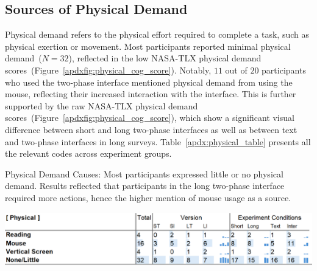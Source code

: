 \subsection{Sources of Physical Demand} 
\label{apdx:physical}
Physical demand refers to the physical effort required to complete a task, such as physical exertion or movement. Most participants reported minimal physical demand~($N=32$), reflected in the low NASA-TLX physical demand scores~(Figure~\ref{apdxfig:physical_cog_score}). Notably, $11$ out of $20$ participants who used the two-phase interface mentioned physical demand from using the mouse, reflecting their increased interaction with the interface. This is further supported by the raw NASA-TLX physical demand scores~(Figure~\ref{apdxfig:physical_cog_score}), which show a significant visual difference between short and long two-phase interfaces as well as between text and two-phase interfaces in long surveys. Table~\ref{apdx:physical_table} presents all the relevant codes across experiment groups.


\begin{table}[h]
    \caption{Physical Demand Causes: Most participants expressed little or no physical demand. Results reflected that participants in the long two-phase interface required more actions, hence the higher mention of mouse usage as a source.}
    \label{apdx:physical_table}
    \includegraphics[width=\linewidth]{content/image/cog/physical_table.png}
\end{table}

